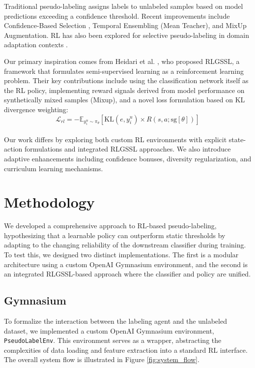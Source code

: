 \documentclass[pdflatex,sn-mathphys-num]{sn-jnl}%
\theoremstyle{thmstyleone}%
\theoremstyle{thmstyletwo}%
\theoremstyle{thmstylethree}%
\begin{document}
Traditional pseudo-labeling assigns labels to unlabeled samples based on model predictions exceeding a confidence threshold. Recent improvements include Confidence-Based Selection \cite{sohn2020fixmatchsimplifyingsemisupervisedlearning}, Temporal Ensembling (Mean Teacher), and MixUp Augmentation. RL has also been explored for selective pseudo-labeling in domain adaptation contexts \cite{liu2020selectivepseudolabelingreinforcementlearning}.

Our primary inspiration comes from Heidari et al. \cite{heidari2024rlgssl}, who proposed RLGSSL, a framework that formulates semi-supervised learning as a reinforcement learning problem. Their key contributions include using the classification network itself as the RL policy, implementing reward signals derived from model performance on synthetically mixed samples (Mixup), and a novel loss formulation based on KL divergence weighting:
\\
\begin{equation}
\mathcal{L}_{rl} = -\mathbb{E}_{y_i^u \sim \pi_\theta} [\text{KL}(e, y_i^u) \times R(s,a;\text{sg}[\theta])]
\end{equation}
\\
Our work differs by exploring both custom RL environments with explicit state-action formulations and integrated RLGSSL approaches. We also introduce adaptive enhancements including confidence bonuses, diversity regularization, and curriculum learning mechanisms.

\section{Methodology}\label{sec:method}

We developed a comprehensive approach to RL-based pseudo-labeling, hypothesizing that a learnable policy can outperform static thresholds by adapting to the changing reliability of the downstream classifier during training. To test this, we designed two distinct implementations. The first is a modular architecture using a custom OpenAI Gymnasium environment, and the second is an integrated RLGSSL-based approach where the classifier and policy are unified.

\subsection{Gymnasium}\label{subsec:gym}

To formalize the interaction between the labeling agent and the unlabeled dataset, we implemented a custom OpenAI Gymnasium environment, \texttt{PseudoLabelEnv}. This environment serves as a wrapper, abstracting the complexities of data loading and feature extraction into a standard RL interface. The overall system flow is illustrated in Figure \ref{fig:system_flow}.
\end{document}
